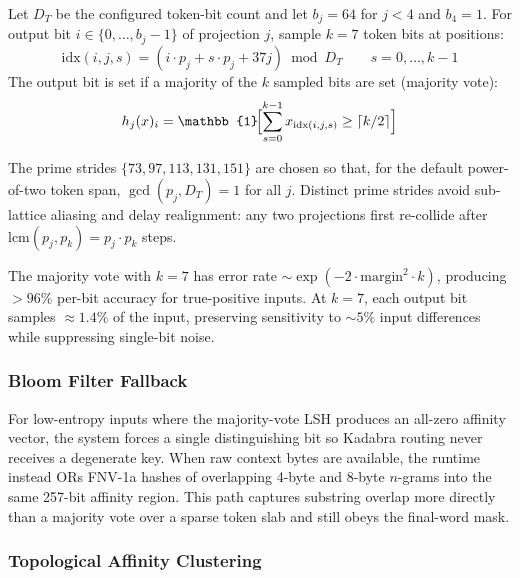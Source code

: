 \begin{definition}
Let $D_T$ be the configured token-bit count and let $b_j = 64$ for
$j < 4$ and $b_4 = 1$.  For output bit $i \in \{0, \ldots, b_j-1\}$ of
projection $j$, sample
$k = 7$ token bits at positions:
\begin{equation}
  \text{idx}(i, j, s) = (i \cdot p_j + s \cdot p_j + 37j) \bmod D_T
  \qquad s = 0, \ldots, k-1
  \label{eq:simhash_index}
\end{equation}
The output bit is set if a majority of the $k$ sampled bits are set
(majority vote):
\begin{equation}
  h_j(x)_i = \mathbb{1}\!\Bigl[\sum_{s=0}^{k-1} x_{\text{idx}(i,j,s)} \geq \lceil k/2 \rceil\Bigr]
  \label{eq:majority_vote}
\end{equation}
\end{definition}

The prime strides $\{73, 97, 113, 131, 151\}$ are chosen so that, for
the default power-of-two token span, $\gcd(p_j, D_T) = 1$ for all $j$.
Distinct prime strides avoid sub-lattice aliasing and delay realignment:
any two projections first re-collide after
$\text{lcm}(p_j, p_k) = p_j \cdot p_k$ steps.

The majority vote with $k = 7$ has error rate
$\sim \exp(-2 \cdot \text{margin}^2 \cdot k)$, producing $>96\%$
per-bit accuracy for true-positive inputs.  At $k = 7$, each output bit
samples $\approx 1.4\%$ of the input, preserving sensitivity to $\sim
5\%$ input differences while suppressing single-bit noise.

\subsubsection{Bloom Filter Fallback}

For low-entropy inputs where the majority-vote LSH produces an all-zero
affinity vector, the system forces a single distinguishing bit so Kadabra
routing never receives a degenerate key.  When raw context bytes are
available, the runtime instead ORs FNV-1a hashes of overlapping 4-byte
and 8-byte $n$-grams into the same 257-bit affinity region.  This path
captures substring overlap more directly than a majority vote over a
sparse token slab and still obeys the final-word mask.

\subsubsection{Topological Affinity Clustering}

